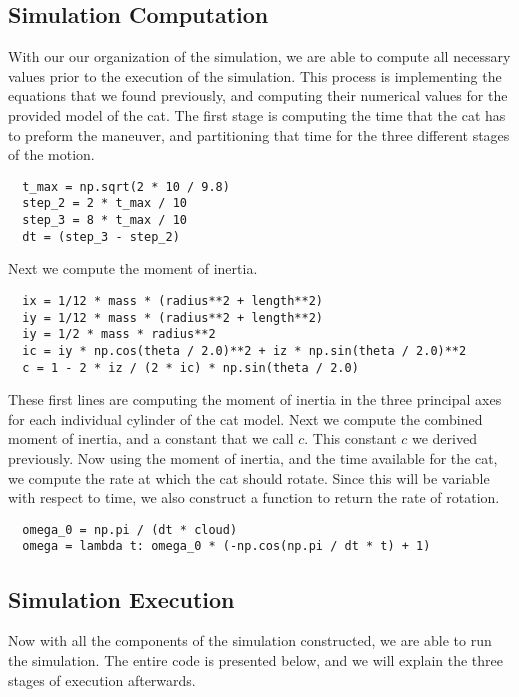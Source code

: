 \documentclass[12]{amsart}
\theoremstyle{definition}
\begin{document}
\subsection{Simulation Computation}%
\label{sub:simulation_computation}

With our our organization of the simulation, we are able to compute all
necessary values prior to the execution of the simulation. This process is
implementing the equations that we found previously, and computing their
numerical values for the provided model of the cat. The first stage is
computing the time that the cat has to preform the maneuver, and partitioning
that time for the three different stages of the motion.
\begin{verbatim}
  t_max = np.sqrt(2 * 10 / 9.8)
  step_2 = 2 * t_max / 10
  step_3 = 8 * t_max / 10
  dt = (step_3 - step_2)
\end{verbatim}
Next we compute the moment of inertia.
\begin{verbatim}
  ix = 1/12 * mass * (radius**2 + length**2)
  iy = 1/12 * mass * (radius**2 + length**2)
  iy = 1/2 * mass * radius**2
  ic = iy * np.cos(theta / 2.0)**2 + iz * np.sin(theta / 2.0)**2
  c = 1 - 2 * iz / (2 * ic) * np.sin(theta / 2.0)
\end{verbatim}
These first lines are computing the moment of inertia in the three principal
axes for each individual cylinder of the cat model. Next we compute the
combined moment of inertia, and a constant that we call $c$. This constant $c$
we derived previously. Now using the moment of inertia, and the time available
for the cat, we compute the rate at which the cat should rotate. Since this
will be variable with respect to time, we also construct a function to return
the rate of rotation.
\begin{verbatim}
  omega_0 = np.pi / (dt * cloud)
  omega = lambda t: omega_0 * (-np.cos(np.pi / dt * t) + 1)
\end{verbatim}

\subsection{Simulation Execution}%
\label{sub:simulation_execution}

Now with all the components of the simulation constructed, we are able to run
the simulation. The entire code is presented below, and we will explain the
three stages of execution afterwards.
\end{document}
